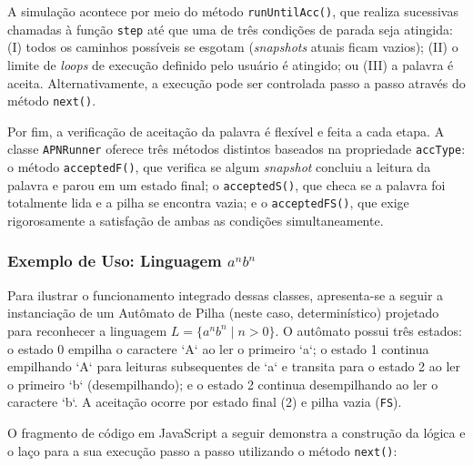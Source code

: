 A simulação acontece por meio do método \texttt{runUntilAcc()}, que realiza sucessivas chamadas à função \texttt{step} até que uma de três condições de parada seja atingida: (I) todos os caminhos possíveis se esgotam (\emph{snapshots} atuais ficam vazios); (II) o limite de \emph{loops} de execução definido pelo usuário é atingido; ou (III) a palavra é aceita. Alternativamente, a execução pode ser controlada passo a passo através do método \texttt{next()}.

Por fim, a verificação de aceitação da palavra é flexível e feita a cada etapa. A classe \texttt{APNRunner} oferece três métodos distintos baseados na propriedade \texttt{accType}: o método \texttt{acceptedF()}, que verifica se algum \emph{snapshot} concluiu a leitura da palavra e parou em um estado final; o \texttt{acceptedS()}, que checa se a palavra foi totalmente lida e a pilha se encontra vazia; e o \texttt{acceptedFS()}, que exige rigorosamente a satisfação de ambas as condições simultaneamente.

\subsubsection{Exemplo de Uso: Linguagem $a^n b^n$}

Para ilustrar o funcionamento integrado dessas classes, apresenta-se a seguir a instanciação de um Autômato de Pilha (neste caso, determinístico) projetado para reconhecer a linguagem $L = \{a^n b^n \mid n > 0\}$. O autômato possui três estados: o estado 0 empilha o caractere `A` ao ler o primeiro `a`; o estado 1 continua empilhando `A` para leituras subsequentes de `a` e transita para o estado 2 ao ler o primeiro `b` (desempilhando); e o estado 2 continua desempilhando ao ler o caractere `b`. A aceitação ocorre por estado final (2) e pilha vazia (\texttt{FS}).

O fragmento de código em JavaScript a seguir demonstra a construção da lógica e o laço para a sua execução passo a passo utilizando o método \texttt{next()}:

